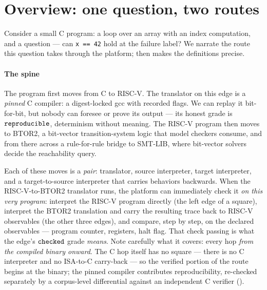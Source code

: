 \section{Overview: one question, two routes}
\label{sec:overview}

Consider a small C program: a loop over an array with an index
computation, and a question --- can \texttt{x == 42} hold at the failure
label? We narrate the route this question takes through the platform;
 then makes the definitions precise.

\paragraph{The spine}
The program first moves from C to RISC-V. The translator on this edge is
a \emph{pinned} C compiler: a digest-locked gcc with recorded flags. We
can replay it bit-for-bit, but nobody can foresee or prove its output ---
its honest grade is $\mathtt{reproducible}$, determinism without meaning. The RISC-V
program then moves to BTOR2, a bit-vector transition-system logic that
model checkers consume, and from there across a rule-for-rule bridge to
SMT-LIB, where bit-vector solvers decide the reachability query.

Each of these moves is a \emph{pair}: translator, source interpreter,
target interpreter, and a target-to-source interpreter that carries
behaviors backwards. When the RISC-V-to-BTOR2 translator runs, the
platform can immediately check it \emph{on this very program}: interpret
the RISC-V program directly (the left edge of a square), interpret the
BTOR2 translation and carry the resulting trace back to RISC-V
observables (the other three edges), and compare, step by step, on the
declared observables --- program counter, registers, halt flag. That
check passing is what the edge's $\mathtt{checked}$ grade \emph{means}. Note
carefully what it covers: every hop \emph{from the compiled binary
onward}. The C hop itself has no square --- there is no C interpreter
and no ISA-to-C carry-back --- so the verified portion of the route
begins at the binary; the pinned compiler contributes reproducibility,
re-checked separately by a corpus-level differential against an
independent C verifier ().

